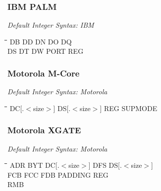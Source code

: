 \subsubsection{IBM PALM}

{\em Default Integer Syntax: IBM}

{\tt\begin{tabbing}
\hspace{3cm}\=\hspace{3cm}\=\hspace{3cm}\=\hspace{3cm}\=\kill
DB         \> DD          \> DN          \> DO          \> DQ \\
DS         \> DT          \> DW          \> PORT        \> REG \\
\end{tabbing}}

\subsubsection{Motorola M-Core}

{\em Default Integer Syntax: Motorola}

{\tt\begin{tabbing}
\hspace{3cm}\=\hspace{3cm}\=\hspace{3cm}\=\hspace{3cm}\=\kill
DC[.$<$size$>$] \> DS[.$<$size$>$] \> REG \> SUPMODE \\
\end{tabbing}}

\subsubsection{Motorola XGATE}

{\em Default Integer Syntax: Motorola}

{\tt\begin{tabbing}
\hspace{3cm}\=\hspace{3cm}\=\hspace{3cm}\=\hspace{3cm}\=\kill
ADR        \> BYT         \> DC[.$<$size$>$] \> DFS     \> DS[.$<$size$>$] \\
FCB        \> FCC         \> FDB         \> PADDING     \> REG \\
RMB \\
\end{tabbing}}

